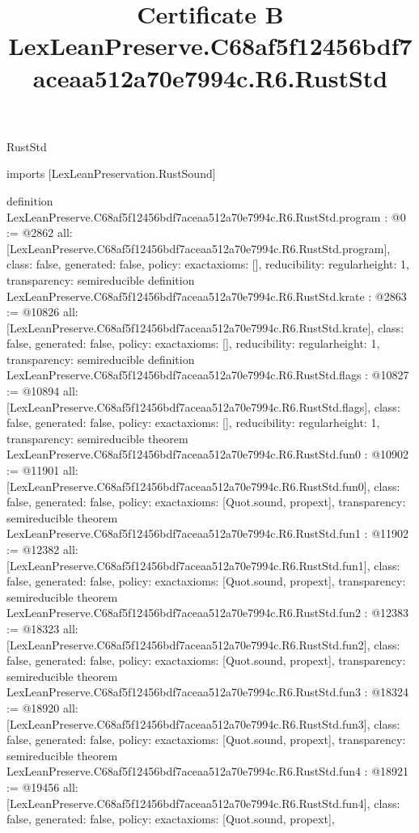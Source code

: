 \begin{lexlean}{RustStd}
\title{Certificate B LexLeanPreserve.C68af5f12456bdf7aceaa512a70e7994c.R6.RustStd}
\begin{coremodule}
imports [LexLeanPreservation.RustSound]

definition LexLeanPreserve.C68af5f12456bdf7aceaa512a70e7994c.R6.RustStd.program : @0 := @2862 {
  all: [LexLeanPreserve.C68af5f12456bdf7aceaa512a70e7994c.R6.RustStd.program],
  class: false,
  generated: false,
  policy: exact{axioms: []},
  reducibility: regular{height: 1},
  transparency: semireducible
}
definition LexLeanPreserve.C68af5f12456bdf7aceaa512a70e7994c.R6.RustStd.krate : @2863 := @10826 {
  all: [LexLeanPreserve.C68af5f12456bdf7aceaa512a70e7994c.R6.RustStd.krate],
  class: false,
  generated: false,
  policy: exact{axioms: []},
  reducibility: regular{height: 1},
  transparency: semireducible
}
definition LexLeanPreserve.C68af5f12456bdf7aceaa512a70e7994c.R6.RustStd.flags : @10827 := @10894 {
  all: [LexLeanPreserve.C68af5f12456bdf7aceaa512a70e7994c.R6.RustStd.flags],
  class: false,
  generated: false,
  policy: exact{axioms: []},
  reducibility: regular{height: 1},
  transparency: semireducible
}
theorem LexLeanPreserve.C68af5f12456bdf7aceaa512a70e7994c.R6.RustStd.fun0 : @10902 := @11901 {
  all: [LexLeanPreserve.C68af5f12456bdf7aceaa512a70e7994c.R6.RustStd.fun0],
  class: false,
  generated: false,
  policy: exact{axioms: [Quot.sound, propext]},
  transparency: semireducible
}
theorem LexLeanPreserve.C68af5f12456bdf7aceaa512a70e7994c.R6.RustStd.fun1 : @11902 := @12382 {
  all: [LexLeanPreserve.C68af5f12456bdf7aceaa512a70e7994c.R6.RustStd.fun1],
  class: false,
  generated: false,
  policy: exact{axioms: [Quot.sound, propext]},
  transparency: semireducible
}
theorem LexLeanPreserve.C68af5f12456bdf7aceaa512a70e7994c.R6.RustStd.fun2 : @12383 := @18323 {
  all: [LexLeanPreserve.C68af5f12456bdf7aceaa512a70e7994c.R6.RustStd.fun2],
  class: false,
  generated: false,
  policy: exact{axioms: [Quot.sound, propext]},
  transparency: semireducible
}
theorem LexLeanPreserve.C68af5f12456bdf7aceaa512a70e7994c.R6.RustStd.fun3 : @18324 := @18920 {
  all: [LexLeanPreserve.C68af5f12456bdf7aceaa512a70e7994c.R6.RustStd.fun3],
  class: false,
  generated: false,
  policy: exact{axioms: [Quot.sound, propext]},
  transparency: semireducible
}
theorem LexLeanPreserve.C68af5f12456bdf7aceaa512a70e7994c.R6.RustStd.fun4 : @18921 := @19456 {
  all: [LexLeanPreserve.C68af5f12456bdf7aceaa512a70e7994c.R6.RustStd.fun4],
  class: false,
  generated: false,
  policy: exact{axioms: [Quot.sound, propext]},
}
\end{coremodule}
\end{lexlean}

